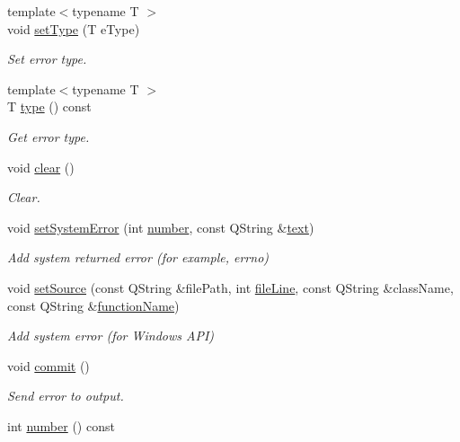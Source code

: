 \begin{DoxyCompactItemize}
{\footnotesize template$<$typename T $>$ }\\void \hyperlink{classmdt_error_afcd233ddf578da2414f8e43c114bcec2}{set\-Type} (T e\-Type)
\begin{DoxyCompactList}\small\item\em Set error type. \end{DoxyCompactList}\item 
{\footnotesize template$<$typename T $>$ }\\T \hyperlink{classmdt_error_a0eb767baa3172dfff7241d58dd0288d5}{type} () const 
\begin{DoxyCompactList}\small\item\em Get error type. \end{DoxyCompactList}\item 
void \hyperlink{classmdt_error_a9fa7eb879fe7b26c4a4f0bd55fe29ffa}{clear} ()
\begin{DoxyCompactList}\small\item\em Clear. \end{DoxyCompactList}\item 
void \hyperlink{classmdt_error_a49254fdb566fee1a4adafe6a3694befc}{set\-System\-Error} (int \hyperlink{classmdt_error_ad233adb8efe4180b85f584c5afdd49fc}{number}, const Q\-String \&\hyperlink{classmdt_error_a8630bb6b21b70edfe3d13eaff82a1baf}{text})
\begin{DoxyCompactList}\small\item\em Add system returned error (for example, errno) \end{DoxyCompactList}\item 
void \hyperlink{classmdt_error_a8dd3203e11b308e6c2701d7f075af885}{set\-Source} (const Q\-String \&file\-Path, int \hyperlink{classmdt_error_a7f5a9ac5e896ba24009bcadddcfe79cb}{file\-Line}, const Q\-String \&class\-Name, const Q\-String \&\hyperlink{classmdt_error_abff9bc71ff554f6f6189be88b0afa731}{function\-Name})
\begin{DoxyCompactList}\small\item\em Add system error (for Windows A\-P\-I) \end{DoxyCompactList}\item 
void \hyperlink{classmdt_error_ad3cccf7c7f7d4bdabdcb4e60794bb9cb}{commit} ()
\begin{DoxyCompactList}\small\item\em Send error to output. \end{DoxyCompactList}\item 
int \hyperlink{classmdt_error_ad233adb8efe4180b85f584c5afdd49fc}{number} () const 

\end{DoxyCompactItemize}

